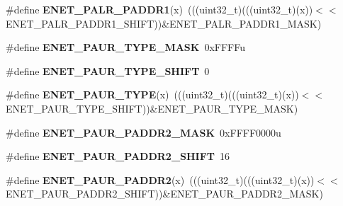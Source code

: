 \begin{DoxyCompactItemize}
\item 
\#define {\bfseries E\+N\+E\+T\+\_\+\+P\+A\+L\+R\+\_\+\+P\+A\+D\+D\+R1}(x)~(((uint32\+\_\+t)(((uint32\+\_\+t)(x))$<$$<$E\+N\+E\+T\+\_\+\+P\+A\+L\+R\+\_\+\+P\+A\+D\+D\+R1\+\_\+\+S\+H\+I\+FT))\&E\+N\+E\+T\+\_\+\+P\+A\+L\+R\+\_\+\+P\+A\+D\+D\+R1\+\_\+\+M\+A\+SK)\hypertarget{group__ENET__Register__Masks_ga990e2f0f1e734c1bfd249159926a49c3}{}\label{group__ENET__Register__Masks_ga990e2f0f1e734c1bfd249159926a49c3}

\item 
\#define {\bfseries E\+N\+E\+T\+\_\+\+P\+A\+U\+R\+\_\+\+T\+Y\+P\+E\+\_\+\+M\+A\+SK}~0x\+F\+F\+F\+Fu\hypertarget{group__ENET__Register__Masks_gac3d991850141898124542b0eafdd1419}{}\label{group__ENET__Register__Masks_gac3d991850141898124542b0eafdd1419}

\item 
\#define {\bfseries E\+N\+E\+T\+\_\+\+P\+A\+U\+R\+\_\+\+T\+Y\+P\+E\+\_\+\+S\+H\+I\+FT}~0\hypertarget{group__ENET__Register__Masks_ga52173426863fc14a746a5c85d5a3ac12}{}\label{group__ENET__Register__Masks_ga52173426863fc14a746a5c85d5a3ac12}

\item 
\#define {\bfseries E\+N\+E\+T\+\_\+\+P\+A\+U\+R\+\_\+\+T\+Y\+PE}(x)~(((uint32\+\_\+t)(((uint32\+\_\+t)(x))$<$$<$E\+N\+E\+T\+\_\+\+P\+A\+U\+R\+\_\+\+T\+Y\+P\+E\+\_\+\+S\+H\+I\+FT))\&E\+N\+E\+T\+\_\+\+P\+A\+U\+R\+\_\+\+T\+Y\+P\+E\+\_\+\+M\+A\+SK)\hypertarget{group__ENET__Register__Masks_ga3159a924961395aaf0c16ed5e44f7c34}{}\label{group__ENET__Register__Masks_ga3159a924961395aaf0c16ed5e44f7c34}

\item 
\#define {\bfseries E\+N\+E\+T\+\_\+\+P\+A\+U\+R\+\_\+\+P\+A\+D\+D\+R2\+\_\+\+M\+A\+SK}~0x\+F\+F\+F\+F0000u\hypertarget{group__ENET__Register__Masks_ga704d9ce6ebfb6b00ae75c12cd226c30c}{}\label{group__ENET__Register__Masks_ga704d9ce6ebfb6b00ae75c12cd226c30c}

\item 
\#define {\bfseries E\+N\+E\+T\+\_\+\+P\+A\+U\+R\+\_\+\+P\+A\+D\+D\+R2\+\_\+\+S\+H\+I\+FT}~16\hypertarget{group__ENET__Register__Masks_ga8a4febd50d867c00d02977b3a4a865dd}{}\label{group__ENET__Register__Masks_ga8a4febd50d867c00d02977b3a4a865dd}

\item 
\#define {\bfseries E\+N\+E\+T\+\_\+\+P\+A\+U\+R\+\_\+\+P\+A\+D\+D\+R2}(x)~(((uint32\+\_\+t)(((uint32\+\_\+t)(x))$<$$<$E\+N\+E\+T\+\_\+\+P\+A\+U\+R\+\_\+\+P\+A\+D\+D\+R2\+\_\+\+S\+H\+I\+FT))\&E\+N\+E\+T\+\_\+\+P\+A\+U\+R\+\_\+\+P\+A\+D\+D\+R2\+\_\+\+M\+A\+SK)\hypertarget{group__ENET__Register__Masks_ga177d37e2b7ec40d918363854e76f0d51}{}\label{group__ENET__Register__Masks_ga177d37e2b7ec40d918363854e76f0d51}


\end{DoxyCompactItemize}
